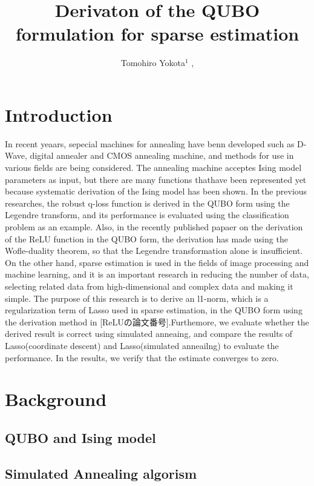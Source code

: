 \documentclass[fp,twocolumn]{jpsj3}
\title{Derivaton of the QUBO formulation for sparse estimation}
\author{Tomohiro Yokota$^1$%
  , }
\begin{document}
\maketitle

\section{Introduction}
In recent yeaars, sepecial machines for annealing have benn developed such as D-Wave, digital annealer and CMOS annealing machine, and methods for use in various fields are being considered. The annealing machine acceptes Ising model parameters as input, but there are many functions thathave been represented yet because systematic derivation of the Ising model has been shown.
In the previous researches, the robust q-loss function is derived in the QUBO form using the Legendre transform, and its performance is evaluated using the classification problem as an example. Also, in the recently published papaer on the derivation of the ReLU function in the QUBO form, the derivation has made using the Wofle-duality theorem, so that the Legendre transformation alone is insufficient.
On the other hand, sparse estimation is used in the fields of image processing and machine learning, and it is an important research in reducing the number of data, selecting related data from high-dimensional and complex data and making it simple.
The purpose of this research is to derive an l1-norm, which is a regularization term of Lasso used in sparse estimation, in the QUBO form using the derivation method in [ReLUの論文番号].Furthemore, we evaluate whether the derived result is correct using simulated anneaing, and compare the results of Lasso(coordinate descent) and Lasso(simulated anneailng) to evaluate the performance. In the results, we verify that the estimate converges to zero.

\section{Background}

\subsection{QUBO and Ising model} %

\subsection{Simulated Annealing algorism} %
\end{document}

